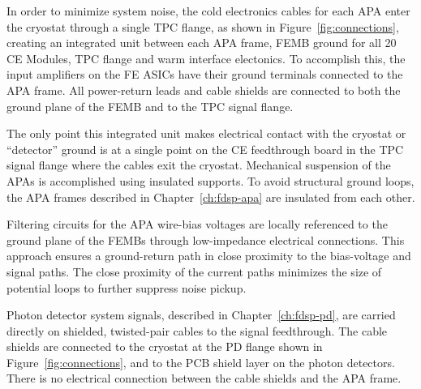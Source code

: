 In order to minimize system noise, the cold electronics cables for each APA enter 
the cryostat through a single TPC flange, as shown in Figure~\ref{fig:connections}, creating an integrated 
unit between each APA frame, FEMB ground for all 20 CE Modules, TPC flange and warm interface
electonics. To accomplish this,
the input amplifiers on the FE ASICs have their ground terminals connected to the APA frame. 
All power-return leads and cable shields are connected to both the ground plane of the FEMB and 
to the TPC signal flange.

The only point this integrated unit makes electrical contact with the 
cryostat or ``detector'' ground is at a single point on the CE feedthrough board in the TPC signal flange where the 
cables exit the cryostat. Mechanical suspension of the APAs is accomplished using insulated supports. 
To avoid structural ground loops, the APA frames described in Chapter~\ref{ch:fdsp-apa} are 
insulated from each other.

Filtering circuits for the APA wire-bias voltages are locally referenced to the ground plane of the FEMBs through low-impedance electrical connections. This approach ensures a ground-return path in close proximity to the bias-voltage and signal paths. The close proximity of the current paths minimizes the size of potential loops to further suppress noise pickup.

Photon detector system signals, described in Chapter~\ref{ch:fdsp-pd}, are carried directly on shielded, 
twisted-pair cables to the signal feedthrough. The cable shields are connected to the cryostat 
at the PD flange shown in Figure~\ref{fig:connections}, and to the PCB shield layer on the photon 
detectors. There is no electrical connection between the cable shields and the APA frame.


